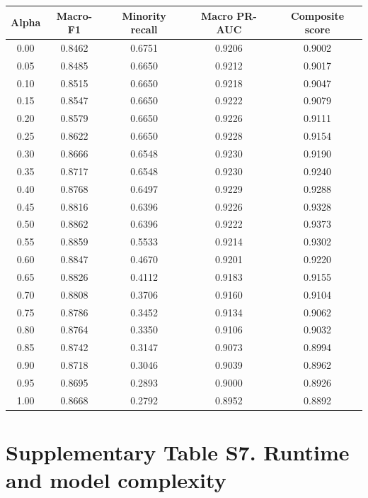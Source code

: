 \documentclass[10pt]{article}
\begin{document}
\begin{center}
\scriptsize
\begin{longtable}{ccccc}
\toprule
Alpha & Macro-F1 & Minority recall & Macro PR-AUC & Composite score \\
\midrule
\endhead
0.00 & 0.8462 & 0.6751 & 0.9206 & 0.9002 \\
0.05 & 0.8485 & 0.6650 & 0.9212 & 0.9017 \\
0.10 & 0.8515 & 0.6650 & 0.9218 & 0.9047 \\
0.15 & 0.8547 & 0.6650 & 0.9222 & 0.9079 \\
0.20 & 0.8579 & 0.6650 & 0.9226 & 0.9111 \\
0.25 & 0.8622 & 0.6650 & 0.9228 & 0.9154 \\
0.30 & 0.8666 & 0.6548 & 0.9230 & 0.9190 \\
0.35 & 0.8717 & 0.6548 & 0.9230 & 0.9240 \\
0.40 & 0.8768 & 0.6497 & 0.9229 & 0.9288 \\
0.45 & 0.8816 & 0.6396 & 0.9226 & 0.9328 \\
0.50 & 0.8862 & 0.6396 & 0.9222 & 0.9373 \\
0.55 & 0.8859 & 0.5533 & 0.9214 & 0.9302 \\
0.60 & 0.8847 & 0.4670 & 0.9201 & 0.9220 \\
0.65 & 0.8826 & 0.4112 & 0.9183 & 0.9155 \\
0.70 & 0.8808 & 0.3706 & 0.9160 & 0.9104 \\
0.75 & 0.8786 & 0.3452 & 0.9134 & 0.9062 \\
0.80 & 0.8764 & 0.3350 & 0.9106 & 0.9032 \\
0.85 & 0.8742 & 0.3147 & 0.9073 & 0.8994 \\
0.90 & 0.8718 & 0.3046 & 0.9039 & 0.8962 \\
0.95 & 0.8695 & 0.2893 & 0.9000 & 0.8926 \\
1.00 & 0.8668 & 0.2792 & 0.8952 & 0.8892 \\
\bottomrule
\end{longtable}
\end{center}

\section*{Supplementary Table S7. Runtime and model complexity}
\end{document}
